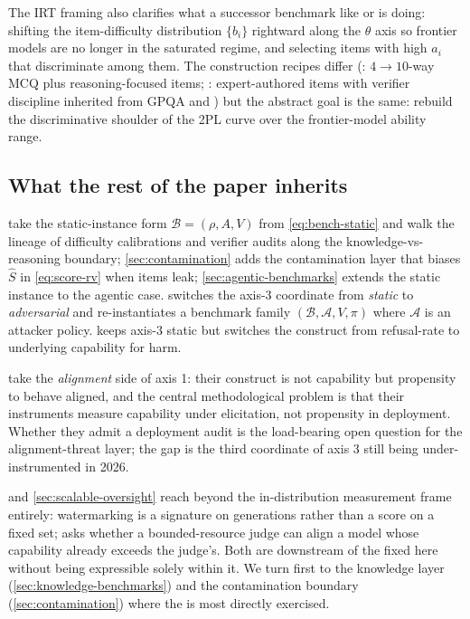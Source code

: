 The IRT framing also clarifies what a successor benchmark like
 \citep{wang2024-mmlu-pro} or  \citep{phan2025-hle} is
doing: shifting the item-difficulty distribution $\{b_i\}$ rightward
along the $\theta$ axis so frontier models are no longer in the
saturated regime, and selecting items with high $a_i$ that
discriminate among them. The construction recipes differ
(: $4 \to 10$-way MCQ plus reasoning-focused items; :
expert-authored items with verifier discipline inherited from
GPQA and ) but the abstract goal is the same: rebuild
the discriminative shoulder of the 2PL curve over the frontier-model
ability range. 

\subsection{What the rest of the paper inherits}
\label{sec:measuring-handoff}

 take the
static-instance form $\mathcal{B} = (\rho, A, V)$ from
\eqref{eq:bench-static} and walk the lineage of difficulty
calibrations and verifier audits along the knowledge-vs-reasoning
boundary; \cref{sec:contamination} adds the contamination layer that
biases $\hat{S}$ in \eqref{eq:score-rv} when items leak;
\cref{sec:agentic-benchmarks} extends the static instance to the
agentic case.  switches the axis-3
coordinate from \emph{static} to \emph{adversarial} and re-instantiates
a benchmark family $(\mathcal{B}, \mathcal{A}, V, \pi)$ where
$\mathcal{A}$ is an attacker policy.
 keeps axis-3 static but switches the
construct from refusal-rate to underlying capability for harm.

 take the
\emph{alignment} side of axis 1: their construct is not capability
but propensity to behave aligned, and the central methodological
problem is that their instruments measure capability under
elicitation, not propensity in deployment. Whether they admit a
deployment audit is the load-bearing open question for the
alignment-threat layer; the gap is the third coordinate of axis 3
still being under-instrumented in 2026.

 and \cref{sec:scalable-oversight} reach
beyond the in-distribution measurement frame entirely: watermarking
is a signature on generations rather than a score on a fixed set;
 asks whether a bounded-resource judge can align a
model whose capability already exceeds the judge's. Both are
downstream of the  fixed here without being expressible
solely within it. We turn first to the knowledge layer
(\cref{sec:knowledge-benchmarks}) and the contamination boundary
(\cref{sec:contamination}) where the  is most directly
exercised.
